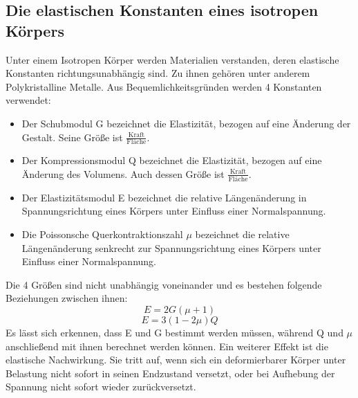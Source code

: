 \subsection{Die elastischen Konstanten eines isotropen Körpers}
Unter einem Isotropen Körper werden Materialien verstanden,
 deren elastische Konstanten richtungsunabhängig sind. Zu ihnen gehören
  unter anderem Polykristalline Metalle. Aus Bequemlichkeitsgründen werden 4 Konstanten verwendet:
  \begin{itemize}
    \item Der Schubmodul G bezeichnet die Elastizität, bezogen auf eine Änderung
     der Gestalt. Seine Größe ist $\frac{\text{Kraft}}{\text{Fläche}}$.

    \item Der Kompressionsmodul Q bezeichnet die Elastizität, bezogen auf
     eine Änderung des Volumens. Auch dessen Größe ist $\frac{\text{Kraft}}{\text{Fläche}}$.

    \item Der Elastizitätsmodul E bezeichnet die relative Längenänderung in
     Spannungsrichtung eines Körpers unter Einfluss einer Normalspannung.

    \item Die Poissonsche Querkontraktionszahl $\mu$ bezeichnet die relative
     Längenänderung senkrecht zur Spannungsrichtung eines Körpers unter
      Einfluss einer Normalspannung.
\end{itemize}
Die 4 Größen sind nicht unabhängig voneinander und es bestehen folgende Beziehungen zwischen ihnen:
\begin{equation}
  E = 2G(\mu + 1)
\end{equation}
\begin{equation}
  E = 3(1-2\mu)Q
\end{equation}
Es lässt sich erkennen, dass E und G bestimmt werden müssen, während Q und $\mu$
 anschließend mit ihnen berechnet werden können. Ein weiterer Effekt ist die
  elastische Nachwirkung. Sie tritt auf, wenn sich ein deformierbarer Körper
   unter Belastung nicht sofort in seinen Endzustand versetzt, oder bei
    Aufhebung der Spannung nicht sofort wieder zurückversetzt.

